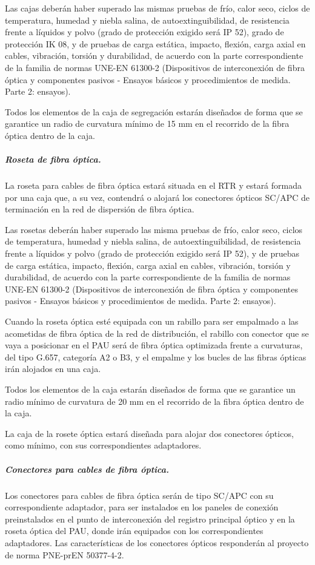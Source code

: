 Las cajas deberán haber superado las mismas pruebas de frío, calor seco, ciclos de temperatura, humedad y niebla salina, de autoextinguibilidad, de resistencia frente a líquidos y polvo (grado de protección exigido será IP 52), grado de protección IK 08, y de pruebas de carga estática, impacto, flexión, carga axial en cables, vibración, torsión y durabilidad, de acuerdo con la parte correspondiente de la familia de normas UNE-EN 61300-2 (Dispositivos de interconexión de fibra óptica y componentes pasivos - Ensayos básicos y procedimientos de medida. Parte 2: ensayos).

Todos los elementos de la caja de segregación estarán diseñados de forma que se garantice un radio de curvatura mínimo de 15 mm en el recorrido de la fibra óptica dentro de la caja.

\subparagraph{Roseta de fibra óptica.}
La roseta para cables de fibra óptica estará situada en el RTR y estará formada por una caja que, a su vez, contendrá o alojará los conectores ópticos SC/APC de terminación en la red de dispersión de fibra óptica.

Las rosetas deberán haber superado las misma pruebas de frío, calor seco, ciclos de temperatura, humedad y niebla salina, de autoextinguibilidad, de resistencia frente a líquidos y polvo (grado de protección exigido será IP 52), y de pruebas de carga estática, impacto, flexión, carga axial en cables, vibración, torsión y durabilidad, de acuerdo con la parte correspondiente de la familia de normas UNE-EN 61300-2 (Dispositivos de interconexión de fibra óptica y componentes pasivos - Ensayos básicos y procedimientos de medida. Parte 2: ensayos).

Cuando la roseta óptica esté equipada con un rabillo para ser empalmado a las acometidas de fibra óptica de la red de distribución, el rabillo con conector que se vaya a posicionar en el PAU será de fibra óptica optimizada frente a curvaturas, del tipo G.657, categoría A2 o B3, y el empalme y los bucles de las fibras ópticas irán alojados en una caja.

Todos los elementos de la caja estarán diseñados de forma que se garantice un radio mínimo de curvatura de 20 mm en el recorrido de la fibra óptica dentro de la caja.

La caja de la rosete óptica estará diseñada para alojar dos conectores ópticos, como mínimo, con sus correspondientes adaptadores.

\subparagraph{Conectores para cables de fibra óptica.}
Los conectores para cables de fibra óptica serán de tipo SC/APC con su correspondiente adaptador, para ser instalados en los paneles de conexión preinstalados en el punto de interconexión del registro principal óptico y en la roseta óptica del PAU, donde irán equipados con los correspondientes adaptadores. Las características de los conectores ópticos responderán al proyecto de norma PNE-prEN 50377-4-2.

